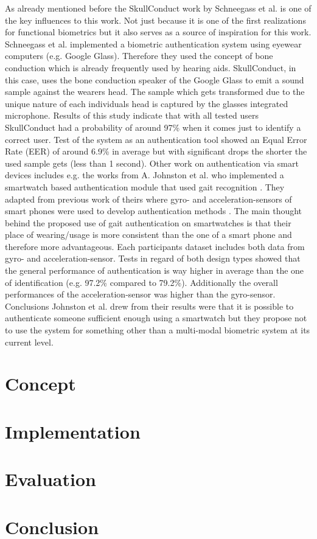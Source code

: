 As already mentioned before the SkullConduct work by Schneegass et al. is one of the key influences to this work. Not just because it is one of the first realizations for functional biometrics but it also 
serves as a source of inspiration for this work.
Schneegass et al. implemented a biometric authentication system using eyewear computers (e.g. Google Glass).
Therefore they used the concept of bone conduction which is already frequently used by hearing aids. SkullConduct, in this case, uses the bone conduction speaker of the Google Glass to emit a sound sample against the wearers head.
The sample which gets transformed due to the unique nature of each individuals head is captured by the glasses integrated microphone.
Results of this study  indicate that with all tested users SkullConduct had a probability of around 97\% when it comes just to identify a correct user.
Test of the system as an authentication tool showed an Equal Error Rate (EER) of around 6.9\% in average but with significant drops the shorter the used sample gets (less than 1 second).
\newline
\newline
Other work on authentication via smart devices includes e.g. the works from A. Johnston et al. who implemented a smartwatch based authentication module that used gait recognition \cite{johnston2015smartwatch}.
They adapted from previous work of theirs where gyro- and acceleration-sensors of smart phones were used to develop authentication methods \cite{kwapisz2010cell}.
The main thought behind the proposed use of gait authentication on smartwatches is that their place of wearing/usage is more consistent than the one of a smart phone and therefore more advantageous.
Each participants dataset includes both data from gyro- and acceleration-sensor.
Tests in regard of both design types showed that the general performance of authentication is way higher in average than the one of identification (e.g. 97.2\% compared to 79.2\%).
Additionally the overall performances of the acceleration-sensor was higher than the gyro-sensor.
Conclusions Johnston et al. drew from their results were that it is possible to authenticate someone sufficient enough using a smartwatch but they propose not to use the system for something other than a multi-modal biometric system at its current level. 

\section{Concept}

\section{Implementation}
\section{Evaluation}
\section{Conclusion}
